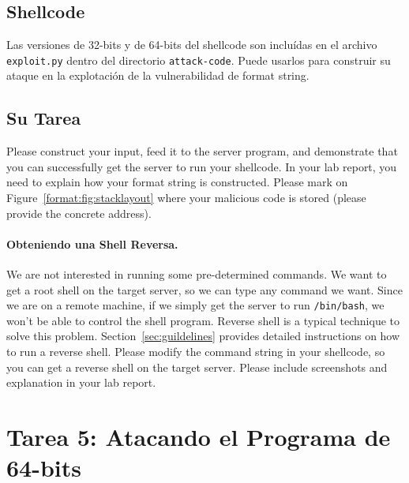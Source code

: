 \subsection{Shellcode} 



Las versiones de 32-bits y de 64-bits del shellcode son incluídas en el archivo \texttt{exploit.py} dentro del directorio \texttt{attack-code}. 
Puede usarlos para construir su ataque en la explotación de la vulnerabilidad de format string.


\subsection{Su Tarea} 

Please construct your input, feed it to the server program, and demonstrate that you can
successfully get the server to run your shellcode. 
In your lab report, you need to explain
how your format string is constructed. Please mark on Figure~\ref{format:fig:stacklayout} where 
your malicious code is stored (please provide the concrete address). 


\paragraph{Obteniendo una Shell Reversa.}
We are not interested in running some pre-determined commands. We
want to get a root shell on the target server, so we can
type any command we want. Since we are on a remote machine,
if we simply get the server to run \texttt{/bin/bash}, we won't be able to
control the shell program. Reverse shell is a typical
technique to solve this problem. Section~\ref{sec:guildelines} provides
detailed instructions on how to run a reverse shell.
Please modify the command string in your shellcode, so you can
get a reverse shell on the target server.
Please include screenshots and explanation in your lab report.



\section{Tarea 5: Atacando el Programa de 64-bits}

